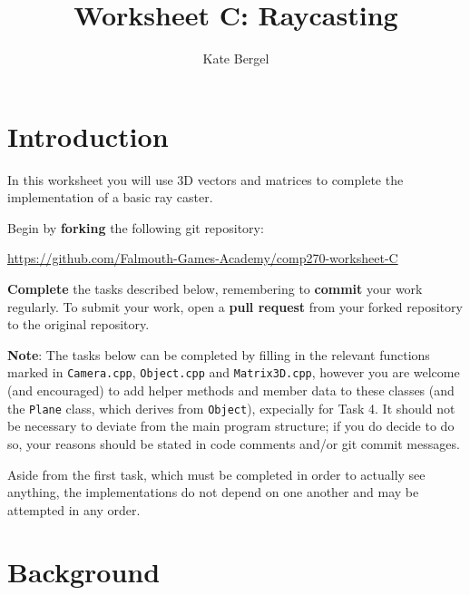 \documentclass{../../../fal_assignment}
\title{Worksheet C: Raycasting}
\author{Kate Bergel}
\begin{document}
\maketitle

\section*{Introduction}

In this worksheet you will use 3D vectors and matrices to complete the implementation of a basic ray caster.

Begin by \textbf{forking} the following git repository:

\begin{center}
	\url{https://github.com/Falmouth-Games-Academy/comp270-worksheet-C}
\end{center}

\textbf{Complete} the tasks described below, remembering to \textbf{commit} your work regularly.
To submit your work, open a \textbf{pull request} from your forked repository to the original repository.

\textbf{Note}: The tasks below can be completed by filling in the relevant functions marked in \texttt{Camera.cpp}, \texttt{Object.cpp} and \texttt{Matrix3D.cpp}, however you are welcome (and encouraged) to add helper methods and member data to these classes (and the \texttt{Plane} class, which derives from \texttt{Object}), expecially for Task 4. It should not be necessary to deviate from the main program structure; if you do decide to do so, your reasons should be stated in code comments and/or git commit messages.

Aside from the first task, which must be completed in order to actually see anything, the implementations do not depend on one another and may be attempted in any order.

\section*{Background}
\end{document}
